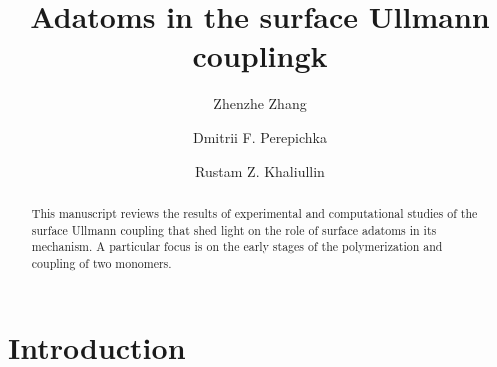 \documentclass[%
 reprint,
 amsmath,amssymb,
 aps,
prb,
]{revtex4-1}
\begin{document}

\title{Adatoms in the surface Ullmann couplingk}%

\author{Zhenzhe Zhang}
\author{Dmitrii F. Perepichka}%
\author{Rustam Z. Khaliullin}
%


\begin{abstract}
This manuscript reviews the results of experimental and computational studies of the surface Ullmann coupling that shed light on the role of surface adatoms in its mechanism. A particular focus is on the early stages of the polymerization and coupling of two monomers.
\end{abstract}

\maketitle


\section{\label{sec:level1}Introduction\protect\\ %
}
\end{document}
